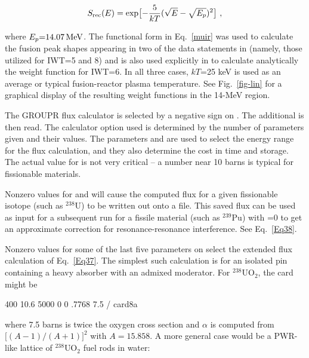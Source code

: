 \begin{equation}
  S_{\rm rec}(E)=\exp \bigl[ -{5 \over{kT}}(\sqrt{E}
  -\sqrt{E_p})^2 \bigr] \,\,,
\label{muir}
\end{equation}

\noindent
where $E_p{=}14.07\,{\rm MeV}$.  The functional form in Eq.~\ref{muir}
was used to calculate the fusion peak shapes appearing in two
of the data statements in 
(namely, those utilized for IWT=5 and 8) and  is also  used explicitly
in  to calculate analytically
the weight function for IWT=6.  In all three cases, $kT$=25 keV is
used as an average or typical fusion-reactor plasma temperature.
See Fig.~\ref{fig-lin} for a graphical display of the resulting
weight functions in the 14-MeV region.

The GROUPR flux calculator is selected by
a negative sign on .  The additional  is
then read.  The calculator option used is determined by the number
of parameters given and their values.  The parameters 
and  are used to select the energy range for the
flux calculation, and they also determine the cost in time
and storage.  The actual value for  is not very
critical -- a number near 10 barns is typical for fissionable materials.

Nonzero values for  and  will cause the
computed flux for a given fissionable isotope (such as $^{238}$U) to be
written out onto a file.  This saved flux can be used as input for a
subsequent run for a fissile material (such as $^{239}$Pu) with
=0 to get an approximate correction for resonance-resonance
interference.  See Eq.~\ref{Eq38}.

Nonzero values for some of the last five parameters on 
select the extended flux calculation of Eq.~\ref{Eq37}.  The simplest
such calculation is for an isolated pin containing a heavy absorber
with an admixed moderator.  For $^{238}$UO$_2$, the card might be

\small
\begin{ccode}

   400 10.6 5000 0 0 .7768 7.5 / card8a

\end{ccode}
\normalsize

\noindent
where 7.5 barns is twice the oxygen cross section and $\alpha$ is computed
from $\bigl[ (A-1)/(A+1)\bigr] ^2$ with $A=15.858$.  A more general case
would be a PWR-like lattice of $^{238}$UO$_2$ fuel rods in water:

